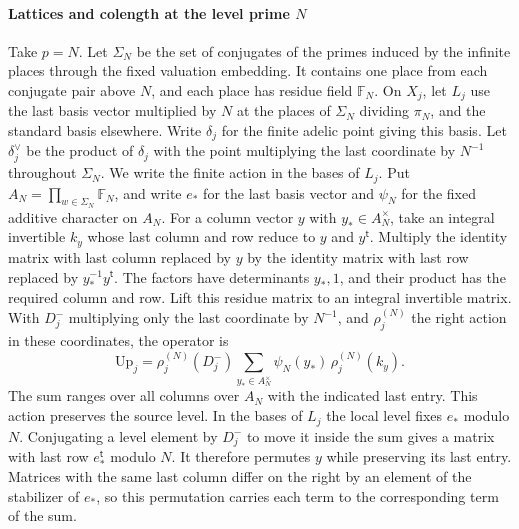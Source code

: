 \paragraph{Lattices and colength at the level prime \(N\)}
Take \(p=N\). Let \(\Sigma_N\) be the set of conjugates of the primes
induced by the infinite places through the fixed valuation embedding.
It contains one place from each conjugate pair above \(N\), and each
place has residue field \(\mathbb F_N\).
On \(X_j\), let \(L_j\) use the last basis vector multiplied by \(N\)
at the places of \(\Sigma_N\) dividing \(\pi_N\), and the standard basis
elsewhere. Write \(\delta_j\) for the finite adelic point giving this basis.
Let \(\delta_j^\vee\) be the product of \(\delta_j\) with the point
multiplying the last coordinate by \(N^{-1}\) throughout \(\Sigma_N\).
We write the finite action in the bases of \(L_j\).
Put \(A_N=\prod_{w\in\Sigma_N}\mathbb F_N\), and write \(e_*\) for the
last basis vector and \(\psi_N\) for the fixed additive character on \(A_N\).
For a column vector \(y\) with \(y_*\in A_N^\times\), take an integral
invertible \(k_y\) whose last column and row reduce to \(y\) and
\(y^{\mathsf t}\). Multiply the identity matrix with last column
replaced by \(y\) by the identity matrix with last row replaced by
\(y_*^{-1}y^{\mathsf t}\). The factors have determinants \(y_*,1\),
and their product has the required column and row. Lift this
residue matrix to an integral invertible matrix.
With \(D_j^-\) multiplying only the last coordinate by \(N^{-1}\),
and \(\rho_j^{(N)}\) the right action in these coordinates, the operator is
\[
 \mathrm{Up}_j=\rho_j^{(N)}(D_j^-)
     \sum_{y_* \in A_N^\times}\psi_N(y_*)\,\rho_j^{(N)}(k_y).
\]
The sum ranges over all columns over \(A_N\) with the indicated last entry.
This action preserves the source level. In the bases of \(L_j\) the
local level fixes \(e_*\) modulo \(N\). Conjugating a level element
by \(D_j^-\) to move it inside the sum gives a matrix with last row
\(e_*^{\mathsf t}\) modulo \(N\).
It therefore permutes \(y\) while preserving its last entry.
Matrices with the same last column differ on the right by an
element of the stabilizer of \(e_*\), so this permutation carries
each term to the corresponding term of the sum.

